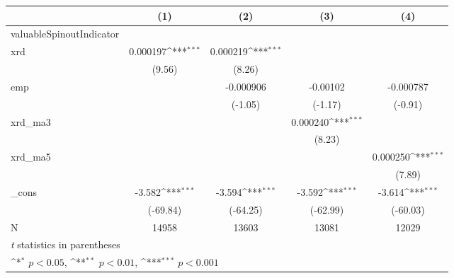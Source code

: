 {
\def\sym#1{\ifmmode^{#1}\else\(^{#1}\)\fi}
\begin{tabular}{l*{4}{c}}
\hline\hline
            &\multicolumn{1}{c}{(1)}         &\multicolumn{1}{c}{(2)}         &\multicolumn{1}{c}{(3)}         &\multicolumn{1}{c}{(4)}         \\
\hline
valuableSpinoutIndicator&                     &                     &                     &                     \\
xrd         &    0.000197\sym{***}&    0.000219\sym{***}&                     &                     \\
            &      (9.56)         &      (8.26)         &                     &                     \\
[1em]
emp         &                     &   -0.000906         &    -0.00102         &   -0.000787         \\
            &                     &     (-1.05)         &     (-1.17)         &     (-0.91)         \\
[1em]
xrd\_ma3     &                     &                     &    0.000240\sym{***}&                     \\
            &                     &                     &      (8.23)         &                     \\
[1em]
xrd\_ma5     &                     &                     &                     &    0.000250\sym{***}\\
            &                     &                     &                     &      (7.89)         \\
[1em]
\_cons      &      -3.582\sym{***}&      -3.594\sym{***}&      -3.592\sym{***}&      -3.614\sym{***}\\
            &    (-69.84)         &    (-64.25)         &    (-62.99)         &    (-60.03)         \\
\hline
N           &       14958         &       13603         &       13081         &       12029         \\
\hline\hline
\multicolumn{5}{l}{\footnotesize \textit{t} statistics in parentheses}\\
\multicolumn{5}{l}{\footnotesize \sym{*} \(p<0.05\), \sym{**} \(p<0.01\), \sym{***} \(p<0.001\)}\\
\end{tabular}
}
